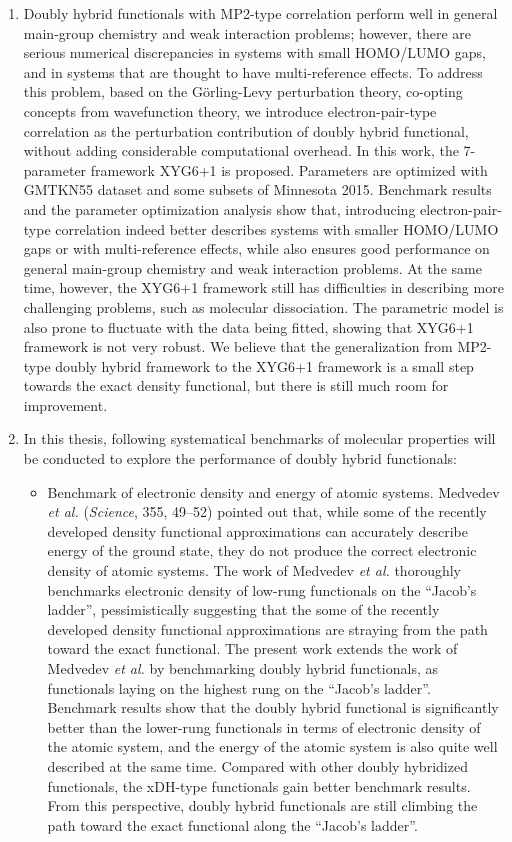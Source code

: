 \begin{abstract*}
\begin{enumerate}[nosep]
\item Doubly hybrid functionals with MP2-type correlation perform well in general main-group chemistry and weak interaction problems; however, there are serious numerical discrepancies in systems with small HOMO/LUMO gaps, and in systems that are thought to have multi-reference effects. To address this problem, based on the Görling-Levy perturbation theory, co-opting concepts from wavefunction theory, we introduce electron-pair-type correlation as the perturbation contribution of doubly hybrid functional, without adding considerable computational overhead. In this work, the 7-parameter framework XYG6+1 is proposed. Parameters are optimized with GMTKN55 dataset and some subsets of Minnesota 2015. Benchmark results and the parameter optimization analysis show that, introducing electron-pair-type correlation indeed better describes systems with smaller HOMO/LUMO gaps or with multi-reference effects, while also ensures good performance on general main-group chemistry and weak interaction problems. At the same time, however, the XYG6+1 framework still has difficulties in describing more challenging problems, such as molecular dissociation. The parametric model is also prone to fluctuate with the data being fitted, showing that XYG6+1 framework is not very robust. We believe that the generalization from MP2-type doubly hybrid framework to the XYG6+1 framework is a small step towards the exact density functional, but there is still much room for improvement.
\item In this thesis, following systematical benchmarks of molecular properties will be conducted to explore the performance of doubly hybrid functionals:
\begin{itemize}[nosep]
    \item Benchmark of electronic density and energy of atomic systems. Medvedev \textit{et al.} (\emph{Science}, 355, 49--52) pointed out that, while some of the recently developed density functional approximations can accurately describe energy of the ground state, they do not produce the correct electronic density of atomic systems. The work of Medvedev \textit{et al.} thoroughly benchmarks electronic density of low-rung functionals on the ``Jacob's ladder'', pessimistically suggesting that the some of the recently developed density functional approximations are straying from the path toward the exact functional. The present work extends the work of Medvedev \textit{et al.} by benchmarking doubly hybrid functionals, as functionals laying on the highest rung on the ``Jacob's ladder''. Benchmark results show that the doubly hybrid functional is significantly better than the lower-rung functionals in terms of electronic density of the atomic system, and the energy of the atomic system is also quite well described at the same time. Compared with other doubly hybridized functionals, the xDH-type functionals gain better benchmark results. From this perspective, doubly hybrid functionals are still climbing the path toward the exact functional along the ``Jacob's ladder''.

\end{itemize}
\end{enumerate}
\end{abstract*}
